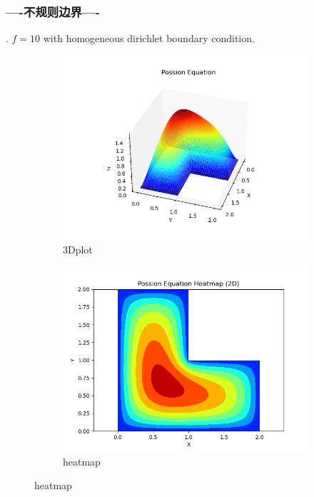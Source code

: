 \subsubsection*{----不规则边界----}.
$f=10$ with homogeneous dirichlet boundary condition.
\begin{figure}[H]
    \centering  
    \begin{subfigure}{0.5\textwidth}  
        \centering  
        \includegraphics[width=0.9\linewidth]{./pics/final/possion/2d/irregularmine3D.png}  
        \caption{3Dplot}  
    \end{subfigure}%
    \begin{subfigure}{0.5\textwidth}  
        \centering  
        \includegraphics[width=0.9\linewidth]{./pics/final/possion/2d/irregularmineheat.png}  
        \caption{heatmap}
    \end{subfigure}  


\end{figure}
